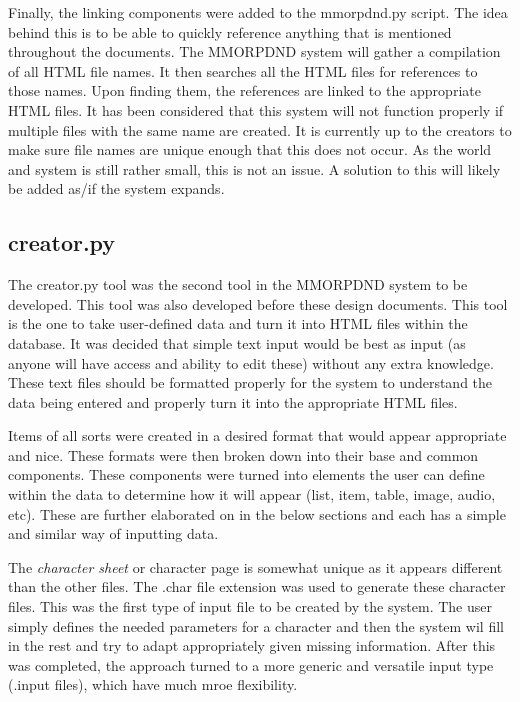 Finally, the linking components were added to the mmorpdnd.py script. The idea behind this is to be able to quickly reference anything that is mentioned throughout the documents. The MMORPDND system will gather a compilation of all HTML file names. It then searches all the HTML files for references to those names. Upon finding them, the references are linked to the appropriate HTML files. It has been considered that this system will not function properly if multiple files with the same name are created. It is currently up to the creators to make sure file names are unique enough that this does not occur. As the world and system is still rather small, this is not an issue. A solution to this will likely be added as/if the system expands.





\subsection{creator.py}

The creator.py tool was the second tool in the MMORPDND system to be developed. This tool was also developed before these design documents. This tool is the one to take user-defined data and turn it into HTML files within the database. It was decided that simple text input would be best as input (as anyone will have access and ability to edit these) without any extra knowledge. These text files should be formatted properly for the system to understand the data being entered and properly turn it into the appropriate HTML files. 

Items of all sorts were created in a desired format that would appear appropriate and nice. These formats were then broken down into their base and common components. These components were turned into elements the user can define within the data to determine how it will appear (list, item, table, image, audio, etc). These are further elaborated on in the below sections and each has a simple and similar way of inputting data.

The \textit{character sheet} or character page is somewhat unique as it appears different than the other files. The .char file extension was used to generate these character files. This was the first type of input file to be created by the system. The user simply defines the needed parameters for a character and then the system wil fill in the rest and try to adapt appropriately given missing information. After this was completed, the approach turned to a more generic and versatile input type (.input files), which have much mroe flexibility. 

